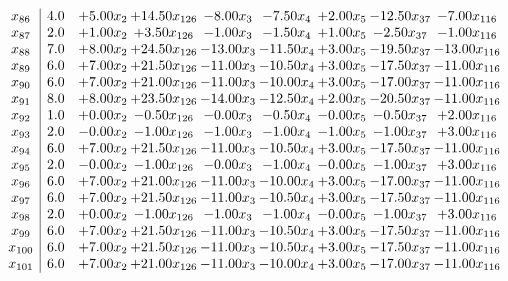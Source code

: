 \documentclass[8pt]{article}
\begin{document}
\[\begin{array}{c| c c@{\hskip 2pt} c@{\hskip 2pt} c@{\hskip 2pt} c@{\hskip 2pt} c@{\hskip 2pt} c@{\hskip 2pt} c@{\hskip 2pt} }
 x_{86}   &  4.0 & +  5.00 x_{2} & + 14.50 x_{126} & -8.00 x_{3} & -7.50 x_{4} & +  2.00 x_{5} & -12.50 x_{37} & -7.00 x_{116}\\
 x_{87}   &  2.0 & +  1.00 x_{2} & +  3.50 x_{126} & -1.00 x_{3} & -1.50 x_{4} & +  1.00 x_{5} & -2.50 x_{37} & -1.00 x_{116}\\
 x_{88}   &  7.0 & +  8.00 x_{2} & + 24.50 x_{126} & -13.00 x_{3} & -11.50 x_{4} & +  3.00 x_{5} & -19.50 x_{37} & -13.00 x_{116}\\
 x_{89}   &  6.0 & +  7.00 x_{2} & + 21.50 x_{126} & -11.00 x_{3} & -10.50 x_{4} & +  3.00 x_{5} & -17.50 x_{37} & -11.00 x_{116}\\
 x_{90}   &  6.0 & +  7.00 x_{2} & + 21.00 x_{126} & -11.00 x_{3} & -10.00 x_{4} & +  3.00 x_{5} & -17.00 x_{37} & -11.00 x_{116}\\
 x_{91}   &  8.0 & +  8.00 x_{2} & + 23.50 x_{126} & -14.00 x_{3} & -12.50 x_{4} & +  2.00 x_{5} & -20.50 x_{37} & -11.00 x_{116}\\
 x_{92}   &  1.0 & +  0.00 x_{2} & -0.50 x_{126} & -0.00 x_{3} & -0.50 x_{4} & -0.00 x_{5} & -0.50 x_{37} & +  2.00 x_{116}\\
 x_{93}   &  2.0 & -0.00 x_{2} & -1.00 x_{126} & -1.00 x_{3} & -1.00 x_{4} & -1.00 x_{5} & -1.00 x_{37} & +  3.00 x_{116}\\
 x_{94}   &  6.0 & +  7.00 x_{2} & + 21.50 x_{126} & -11.00 x_{3} & -10.50 x_{4} & +  3.00 x_{5} & -17.50 x_{37} & -11.00 x_{116}\\
 x_{95}   &  2.0 & -0.00 x_{2} & -1.00 x_{126} & -0.00 x_{3} & -1.00 x_{4} & -0.00 x_{5} & -1.00 x_{37} & +  3.00 x_{116}\\
 x_{96}   &  6.0 & +  7.00 x_{2} & + 21.00 x_{126} & -11.00 x_{3} & -10.00 x_{4} & +  3.00 x_{5} & -17.00 x_{37} & -11.00 x_{116}\\
 x_{97}   &  6.0 & +  7.00 x_{2} & + 21.50 x_{126} & -11.00 x_{3} & -10.50 x_{4} & +  3.00 x_{5} & -17.50 x_{37} & -11.00 x_{116}\\
 x_{98}   &  2.0 & +  0.00 x_{2} & -1.00 x_{126} & -1.00 x_{3} & -1.00 x_{4} & -0.00 x_{5} & -1.00 x_{37} & +  3.00 x_{116}\\
 x_{99}   &  6.0 & +  7.00 x_{2} & + 21.50 x_{126} & -11.00 x_{3} & -10.50 x_{4} & +  3.00 x_{5} & -17.50 x_{37} & -11.00 x_{116}\\
 x_{100}   &  6.0 & +  7.00 x_{2} & + 21.50 x_{126} & -11.00 x_{3} & -10.50 x_{4} & +  3.00 x_{5} & -17.50 x_{37} & -11.00 x_{116}\\
 x_{101}   &  6.0 & +  7.00 x_{2} & + 21.00 x_{126} & -11.00 x_{3} & -10.00 x_{4} & +  3.00 x_{5} & -17.00 x_{37} & -11.00 x_{116}\\

\end{array}\]
\end{document}

